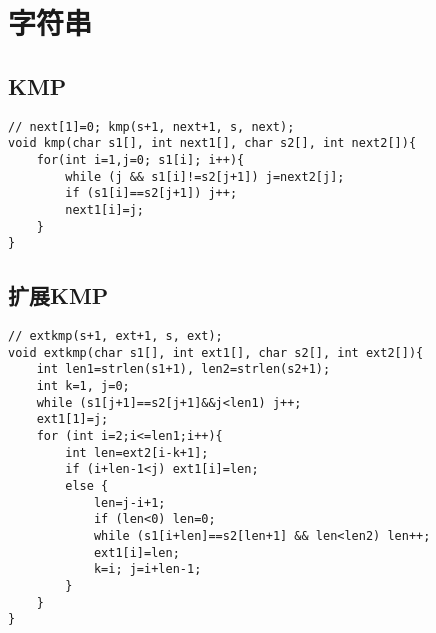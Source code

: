 \documentclass{article}
\begin{document}
\section{字符串}

\subsection{KMP}
\begin{lstlisting}
// next[1]=0; kmp(s+1, next+1, s, next);
void kmp(char s1[], int next1[], char s2[], int next2[]){
	for(int i=1,j=0; s1[i]; i++){
        while (j && s1[i]!=s2[j+1]) j=next2[j];
        if (s1[i]==s2[j+1]) j++;
        next1[i]=j;
    }
}
\end{lstlisting}

\subsection{扩展KMP}
\begin{lstlisting}
// extkmp(s+1, ext+1, s, ext);
void extkmp(char s1[], int ext1[], char s2[], int ext2[]){
	int len1=strlen(s1+1), len2=strlen(s2+1);
	int k=1, j=0;
	while (s1[j+1]==s2[j+1]&&j<len1) j++;
	ext1[1]=j;
	for (int i=2;i<=len1;i++){
		int len=ext2[i-k+1];
		if (i+len-1<j) ext1[i]=len;
		else {
			len=j-i+1;
			if (len<0) len=0;
			while (s1[i+len]==s2[len+1] && len<len2) len++;
			ext1[i]=len;
			k=i; j=i+len-1;
		}
	}
}
\end{lstlisting}
\end{document}
